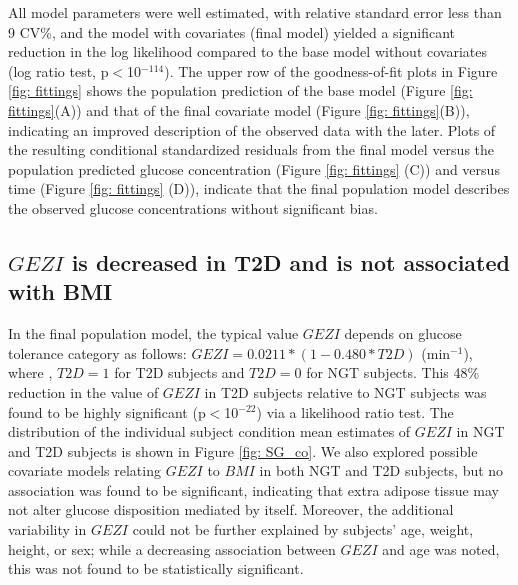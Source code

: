 \documentclass[utf8]{frontiersSCNS} %
\begin{document}
All model parameters were well estimated, with relative standard error less than 9 CV\%, and the model with covariates (final model) yielded a significant reduction in the log likelihood compared to the base model without covariates (log ratio test, p$<$10$^{-114}$). The upper row of the goodness-of-fit plots in Figure \ref{fig: fittings} shows the population prediction of the base model (Figure \ref{fig: fittings}(A)) and that of the final covariate model (Figure \ref{fig: fittings}(B)), indicating an improved description of the observed data with the later. Plots of the resulting conditional standardized residuals from the final model versus the population predicted glucose concentration (Figure \ref{fig: fittings} (C)) and versus time (Figure \ref{fig: fittings} (D)), indicate that the final population model describes the observed glucose concentrations without significant bias.
\subsection{$GEZI$ is decreased in T2D and is not associated with BMI}
In the final population model, the typical value $GEZI$ depends on glucose tolerance category as follows: $GEZI=0.0211*(1-0.480*T2D)$ (min$^{-1}$), where , $T2D=1$ for T2D subjects and $T2D=0$ for NGT subjects. This 48\% reduction in the value of $GEZI$ in T2D subjects relative to NGT subjects was found to be highly significant (p$<$10$^{-22}$) via a likelihood ratio test. The distribution of the individual subject condition mean estimates of $GEZI$ in NGT and T2D subjects is shown in Figure \ref{fig: SG_co}. We also explored possible covariate models relating $GEZI$ to $BMI$ in both NGT and T2D subjects, but no association was found to be significant, indicating that extra adipose tissue may not alter glucose disposition mediated by itself. Moreover, the additional variability in $GEZI$ could not be further explained by subjects’ age, weight, height, or sex; while a decreasing association between $GEZI$ and age was noted, this was not found to be statistically significant.
\end{document}
